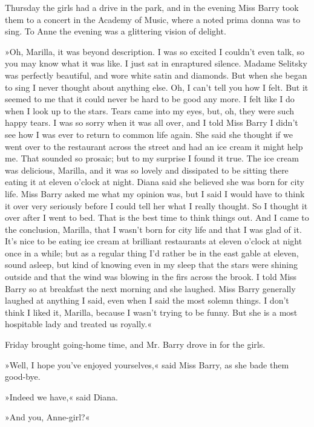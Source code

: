 Thursday the girls had a drive in the park, and in the evening Miss Barry took them to a concert in the Academy of Music, where a noted prima donna was to sing. To Anne the evening was a glittering vision of delight.

»Oh, Marilla, it was beyond description. I was so excited I couldn’t even talk, so you may know what it was like. I just sat in enraptured silence. Madame Selitsky was perfectly beautiful, and wore white satin and diamonds. But when she began to sing I never thought about anything else. Oh, I can’t tell you how I felt. But it seemed to me that it could never be hard to be good any more. I felt like I do when I look up to the stars. Tears came into my eyes, but, oh, they were such happy tears. I was so sorry when it was all over, and I told Miss Barry I didn’t see how I was ever to return to common life again. She said she thought if we went over to the restaurant across the street and had an ice cream it might help me. That sounded so prosaic; but to my surprise I found it true. The ice cream was delicious, Marilla, and it was so lovely and dissipated to be sitting there eating it at eleven o’clock at night. Diana said she believed she was born for city life. Miss Barry asked me what my opinion was, but I said I would have to think it over very seriously before I could tell her what I really thought. So I thought it over after I went to bed. That is the best time to think things out. And I came to the conclusion, Marilla, that I wasn’t born for city life and that I was glad of it. It’s nice to be eating ice cream at brilliant restaurants at eleven o’clock at night once in a while; but as a regular thing I’d rather be in the east gable at eleven, sound asleep, but kind of knowing even in my sleep that the stars were shining outside and that the wind was blowing in the firs across the brook. I told Miss Barry so at breakfast the next morning and she laughed. Miss Barry generally laughed at anything I said, even when I said the most solemn things. I don’t think I liked it, Marilla, because I wasn’t trying to be funny. But she is a most hospitable lady and treated us royally.«

Friday brought going-home time, and Mr. Barry drove in for the girls.

»Well, I hope you’ve enjoyed yourselves,« said Miss Barry, as she bade them good-bye.

»Indeed we have,« said Diana.

»And you, Anne-girl?«

